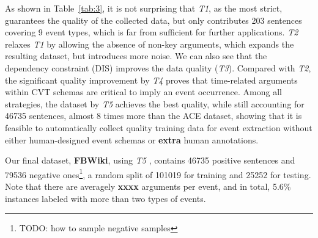 As shown in Table~\ref{tab:3}, it is not surprising that \emph{T1}, as the most strict, guarantees the quality of the collected data, but only contributes 203 sentences covering 9 event types, which is far from sufficient for further applications. \emph{T2} relaxes \emph{T1} by allowing the absence of non-key arguments, which expands the resulting dataset, but introduces more noise. 
We can also see that the dependency constraint (DIS) improves the data quality (\emph{T3}).
Compared with \emph{T2}, the significant quality improvement by \emph{T4} proves that time-related arguments within CVT schemas are critical to imply an event occurrence. Among all strategies, the dataset by \emph{T5} achieves the best quality, while still accounting for 46735 sentences, almost 8 times more than the ACE dataset, showing that it is feasible to automatically collect quality training data for event extraction without either human-designed event schemas or \textbf{extra} human annotations.     


Our final dataset, \textbf{FBWiki}, using \emph{T5} , contains 46735 positive sentences and 79536 negative 
ones\footnote{TODO: how to sample negative samples}, a random split of 101019 for 
training and 25252 for testing. Note that there are averagely \textbf{xxxx} arguments per event, 
 and in total, 5.6\% instances labeled with more than two types of events. 

